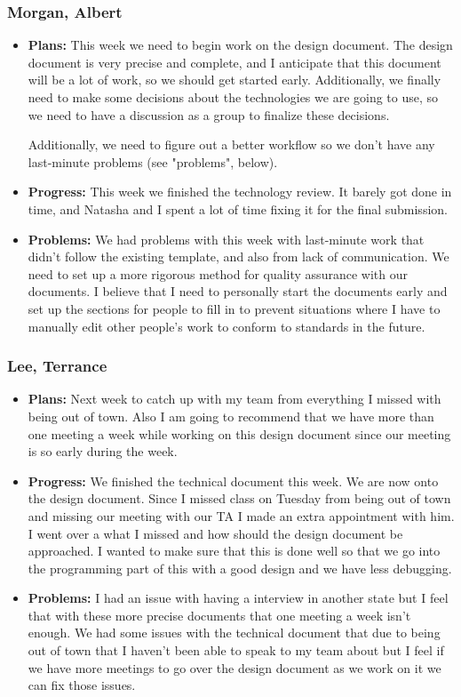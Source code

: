 \documentclass[10pt,draftclsnofoot,onecolumn]{IEEEtran}
\begin{document}
\subsubsection{Morgan, Albert}
\begin{itemize}
	\item \textbf{Plans: }
	This week we need to begin work on the design document. The design document is very precise and complete, and I anticipate that this document will be a lot of work, so we should get started early. Additionally, we finally need to make some decisions about the technologies we are going to use, so we need to have a discussion as a group to finalize these decisions.

	Additionally, we need to figure out a better workflow so we don't have any last-minute problems (see "problems", below).
	\item \textbf{Progress: }
	This week we finished the technology review. It barely got done in time, and Natasha and I spent a lot of time fixing it for the final submission.
	\item \textbf{Problems: }
	We had problems with this week with last-minute work that didn't follow the existing template, and also from lack of communication. We need to set up a more rigorous method for quality assurance with our documents. I believe that I need to personally start the documents early and set up the sections for people to fill in to prevent situations where I have to manually edit other people's work to conform to standards in the future.
\end{itemize}
\subsubsection{Lee, Terrance}
\begin{itemize}
	\item \textbf{Plans: }Next week to catch up with my team from everything I missed with being out of town. Also I am going to recommend that we have more than one meeting a week while working on this design document since our meeting is so early during the week.
	\item \textbf{Progress: }We finished the technical document this week. We are now onto the design document. Since I missed class on Tuesday from being out of town and missing our meeting with our TA I made an extra appointment with him. I went over a what I missed and how should the design document be approached. I wanted to make sure that this is done well so that we go into the programming part of this with a good design and we have less debugging.
	\item \textbf{Problems: }I had an issue with having a interview in another state but I feel that with these more precise documents that one meeting a week isn't enough. We had some issues with the technical document that due to being out of town that I haven't been able to speak to my team about but I feel if we have more meetings to go over the design document as we work on it we can fix those issues.
\end{itemize}
\end{document}
